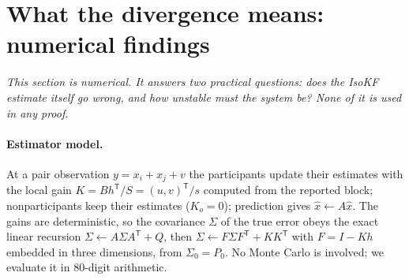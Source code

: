 \documentclass[11pt,a4paper]{article}
\numberwithin{equation}{section}
\theoremstyle{remark}\newtheorem{remark}[theorem]{Remark}
\newcommand{\T}{^{\mathsf T}}
\begin{document}
\section{What the divergence means: numerical findings}\label{sec:meaning}

\emph{This section is numerical. It answers two practical questions: does the IsoKF estimate
itself go wrong, and how unstable must the system be? None of it is used in any proof.}

\paragraph{Estimator model.} At a pair observation $y=x_i+x_j+v$ the participants update their
estimates with the local gain $K=Bh\T/S=(u,v)\T/s$ computed from the reported block;
nonparticipants keep their estimates ($K_o=0$); prediction gives $\hat x\leftarrow A\hat x$.
The gains are deterministic, so the covariance $\Sigma$ of the true error obeys the exact linear
recursion $\Sigma\leftarrow A\Sigma A\T+Q$, then $\Sigma\leftarrow F\Sigma F\T+KK\T$ with
$F=I-Kh$ embedded in three dimensions, from $\Sigma_0=P_0$. No Monte Carlo is involved; we
evaluate it in 80-digit arithmetic.
\end{document}
